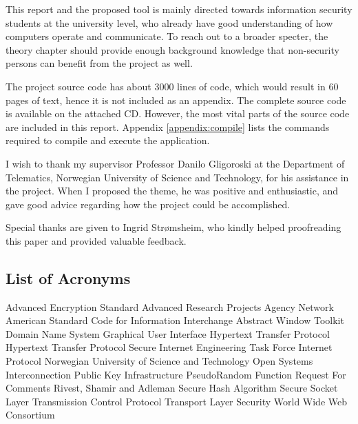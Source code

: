 \documentclass[12pt,a4paper,titlepage]{report}
\begin{document}
This report and the proposed tool is mainly directed towards information security students at the university level, who already have good understanding of how computers operate and communicate. To reach out to a broader specter, the theory chapter should provide enough background knowledge that non-security persons can benefit from the project as well.

The project source code has about 3000 lines of code, which would result in 60 pages of text, hence it is not included as an appendix. The complete source code is available on the attached CD. However, the most vital parts of the source code are included in this report. Appendix \ref{appendix:compile} lists the commands required to compile and execute the application.

I wish to thank my supervisor Professor Danilo Gligoroski at the Department of Telematics, Norwegian University of Science and Technology, for his assistance in the project. When I proposed the theme, he was positive and enthusiastic, and gave good advice regarding how the project could be accomplished.

Special thanks are given to Ingrid Strømsheim, who kindly helped proofreading this paper and provided valuable feedback.

\tableofcontents
\listoffigures
\listoftables

\newpage
\begin{acronym}
\section*{List of Acronyms}
 {Advanced Encryption Standard}
 {Advanced Research Projects Agency Network}
 {American Standard Code for Information Interchange}
 {Abstract Window Toolkit}
 {Domain Name System}
 {Graphical User Interface}
 {Hypertext Transfer Protocol}
 {Hypertext Transfer Protocol Secure}
 {Internet Engineering Task Force}
 {Internet Protocol}
 {Norwegian University of Science and Technology}
 {Open Systems Interconnection}
 {Public Key Infrastructure}
 {PseudoRandom Function}
 {Request For Comments}
 {Rivest, Shamir and Adleman}
 {Secure Hash Algorithm}
 {Secure Socket Layer}
 {Transmission Control Protocol}
 {Transport Layer Security} 
 {World Wide Web Consortium}
\end{acronym}
\end{document}
